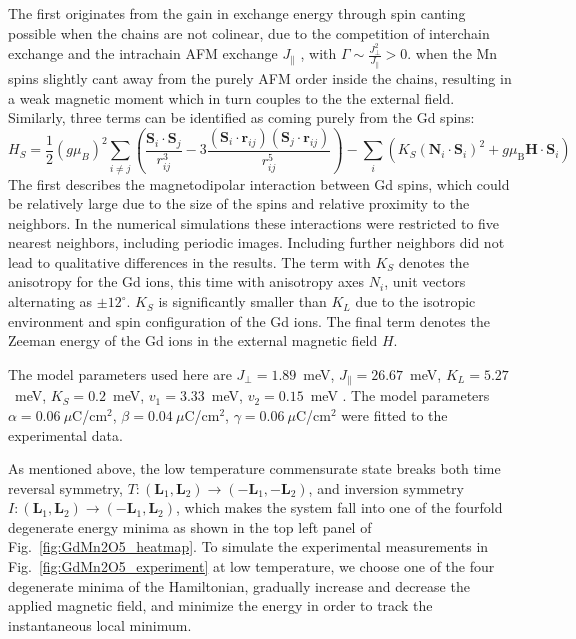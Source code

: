 The first originates from the gain in exchange energy through spin canting possible when the chains are not colinear, due to the competition of interchain exchange  and the intrachain AFM exchange $J_\|$ \cite{Sushkov2008} , with $\Gamma\sim\frac{J_{\perp}^2}{J_\|}>0$. when the Mn spins slightly cant away from the purely AFM order inside the chains, resulting in a weak magnetic moment which in turn couples to the the external field. 
Similarly, three terms can be identified as coming purely from the Gd spins:
\begin{equation}
     H_S=\frac{1}{2}(g \mu_B)^2\sum_{i\neq j}\left(\frac{\mathbf{S}_i\cdot \mathbf{S}_j}{r_{ij}^3}-3\frac{(\mathbf{S}_i\cdot \mathbf{r}_{ij})(\mathbf{S}_j\cdot \mathbf{r}_{ij})}{r_{ij}^5}\right) - \sum_i\left( K_S(\mathbf{N}_i\cdot \mathbf{S}_i)^2 + g\mu_\mathrm{B} \mathbf{H} \cdot \mathbf{S}_i\right) 
\end{equation}
The first describes the magnetodipolar interaction between Gd spins, which could be relatively large due to the size of the spins and relative proximity to the neighbors. In the numerical simulations these interactions were restricted to five nearest neighbors, including periodic images. Including further neighbors did not lead to qualitative differences in the results. The term with $K_S$ denotes the anisotropy for the Gd ions, this time with anisotropy axes $N_i$, unit vectors alternating as $\pm 12^\circ$. $K_S$ is significantly smaller than $K_L$ due to the isotropic environment and spin configuration of the Gd ions.
The final term denotes the Zeeman energy of the Gd ions in the external magnetic field $H$.

The model parameters used here are $J_\perp = 1.89$~meV, $J_\parallel = 26.67$~meV, $K_L = 5.27$~meV, $K_S = 0.2$~meV, $v_1 = 3.33$~meV, $v_2 = 0.15$~meV . 
The model parameters $\alpha = 0.06\:\mu$C/cm$^2$, $\beta = 0.04\:\mu$C/cm$^2$, $\gamma = 0.06\:\mu$C/cm$^2$ were fitted to the experimental data.

As mentioned above, the low temperature commensurate state breaks both time reversal symmetry, $T: (\mathbf{L}_1, \mathbf{L}_2) \rightarrow (-\mathbf{L}_1, -\mathbf{L}_2)$, and inversion symmetry $I:(\mathbf{L}_1, \mathbf{L}_2) \rightarrow (-\mathbf{L}_1, \mathbf{L}_2)$, which makes the system fall into one of the fourfold degenerate energy minima as shown in the top left panel of Fig.~\ref{fig:GdMn2O5_heatmap}. 
To simulate the experimental measurements in Fig.~\ref{fig:GdMn2O5_experiment} at low temperature, we choose one of the four degenerate minima of the Hamiltonian, gradually increase and decrease the applied magnetic field, and minimize the energy in order to track the instantaneous local minimum. 

